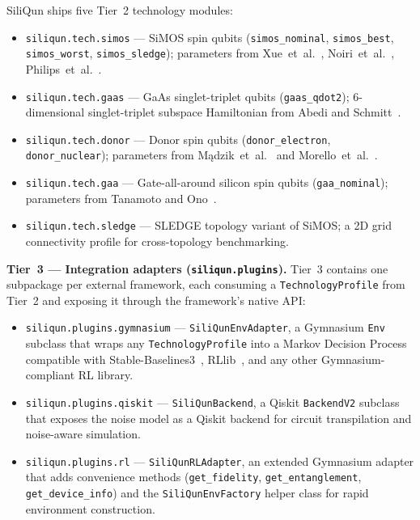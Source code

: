 SiliQun ships five Tier~2 technology modules:

\begin{itemize}
  \item \texttt{siliqun.tech.simos} — SiMOS spin qubits
    (\texttt{simos\_nominal}, \texttt{simos\_best}, \texttt{simos\_worst},
    \texttt{simos\_sledge}); parameters from
    Xue~et~al.~\cite{Xue2022}, Noiri~et~al.~\cite{Noiri2022},
    Philips~et~al.~\cite{Philips2022}.
  \item \texttt{siliqun.tech.gaas} — GaAs singlet-triplet qubits
    (\texttt{gaas\_qdot2}); 6-dimensional singlet-triplet subspace
    Hamiltonian from Abedi and Schmitt~\cite{Abedi2025}.
  \item \texttt{siliqun.tech.donor} — Donor spin qubits
    (\texttt{donor\_electron}, \texttt{donor\_nuclear}); parameters
    from M\k{a}dzik~et~al.~\cite{Madzik2022} and
    Morello~et~al.~\cite{Morello2020}.
  \item \texttt{siliqun.tech.gaa} — Gate-all-around silicon spin qubits
    (\texttt{gaa\_nominal}); parameters from Tanamoto and
    Ono~\cite{Tanamoto2025}.
  \item \texttt{siliqun.tech.sledge} — SLEDGE topology variant of SiMOS;
    a 2D grid connectivity profile for cross-topology benchmarking.
\end{itemize}

\textbf{Tier~3 — Integration adapters (\texttt{siliqun.plugins}).}
Tier~3 contains one subpackage per external framework, each consuming
a \texttt{TechnologyProfile} from Tier~2 and exposing it through the
framework's native API:

\begin{itemize}
  \item \texttt{siliqun.plugins.gymnasium} — \texttt{SiliQunEnvAdapter},
    a Gymnasium \texttt{Env} subclass that wraps any
    \texttt{TechnologyProfile} into a Markov Decision Process compatible
    with Stable-Baselines3~\cite{Raffin2021}, RLlib~\cite{Liang2018},
    and any other Gymnasium-compliant RL library.
  \item \texttt{siliqun.plugins.qiskit} — \texttt{SiliQunBackend},
    a Qiskit \texttt{BackendV2} subclass that exposes the noise model
    as a Qiskit backend for circuit transpilation and noise-aware simulation.
  \item \texttt{siliqun.plugins.rl} — \texttt{SiliQunRLAdapter},
    an extended Gymnasium adapter that adds convenience methods
    (\texttt{get\_fidelity}, \texttt{get\_entanglement},
    \texttt{get\_device\_info}) and the \texttt{SiliQunEnvFactory}
    helper class for rapid environment construction.
\end{itemize}

